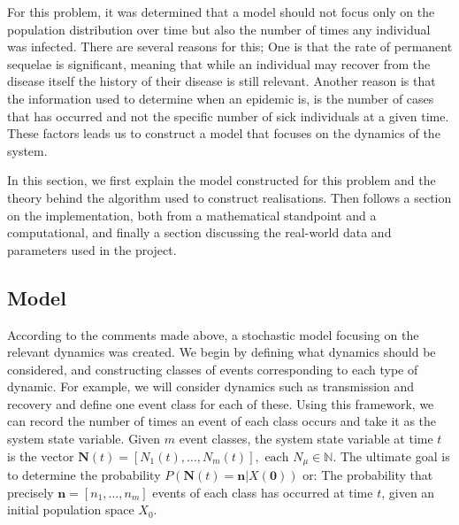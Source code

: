 \documentclass[10pt,a4paper]{article}
\begin{document}
For this problem, it was determined that a model should not focus only on the population distribution over time but also the number of times any individual was infected. There are several reasons for this; One is that the rate of permanent sequelae is significant, meaning that while an individual may recover from the disease itself the history of their disease is still relevant. Another reason is that the information used to determine when an epidemic is, is the number of cases that has occurred and not the specific number of sick individuals at a given time. These factors leads us to construct a model that focuses on the dynamics of the system.

In this section, we first explain the model constructed for this problem and the theory behind the algorithm used to construct realisations. Then follows a section on the implementation, both from a mathematical standpoint and a computational, and finally a section discussing the real-world data and parameters used in the project.

%
%


\subsection{Model} \label{section:model}

According to the comments made above, a stochastic model focusing on the relevant dynamics was created. We begin by defining what dynamics should be considered, and constructing classes of events corresponding to each type of dynamic. For example, we will consider dynamics such as transmission and recovery and define one event class for each of these. Using this framework, we can record the number of times an event of each class occurs and take it as the system state variable. Given $m$ event classes, the system state variable at time $t$ is the vector $\bm{N}\left( t \right) = \left[ N_1 \left( t \right), \ldots, N_m \left( t \right) \right], \textrm{ each }N_\mu \in \mathbb{N}$. The ultimate goal is to determine the probability $P \left( \bm{N}\left( t \right)  = \bm{n} | X\left( \bm{0} \right) \right)$ or: The probability that precisely $\bm{n} = \left[ n_1, \ldots, n_m \right]$ events of each class has occurred at time $t$, given an initial population space $X_0$.
\end{document}
